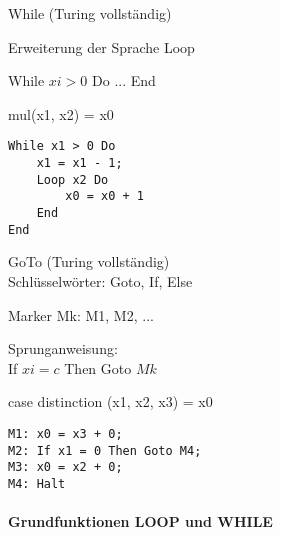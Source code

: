 \begin{minipage}{0.5\linewidth}
    \begin{KR}{While (Turing vollständig)}

        Erweiterung der Sprache Loop

        While $xi > 0$ Do ... End
    \end{KR}
    \begin{example} mul(x1, x2) = x0 

\begin{lstlisting}[style=Pseudocode, aboveskip=-0.05\baselineskip, belowskip=-0.5\baselineskip]
While x1 > 0 Do
    x1 = x1 - 1;
    Loop x2 Do
        x0 = x0 + 1
    End
End
\end{lstlisting}
\end{example}
\end{minipage}
\begin{minipage}{0.5\linewidth}
\begin{KR}{GoTo (Turing vollständig)}\\
        Schlüsselwörter: Goto, If, Else
        
        Marker Mk: M1, M2, ...
        
        Sprunganweisung:\\ If $xi = c$ Then Goto $Mk$ 
\end{KR}
\begin{example} case distinction (x1, x2, x3) = x0
\begin{lstlisting}[style=Pseudocode, aboveskip=-0.05\baselineskip, belowskip=-0.5\baselineskip]
M1: x0 = x3 + 0;
M2: If x1 = 0 Then Goto M4;
M3: x0 = x2 + 0;
M4: Halt
\end{lstlisting}
\end{example}
\end{minipage}

\paragraph*{Grundfunktionen LOOP und WHILE}

